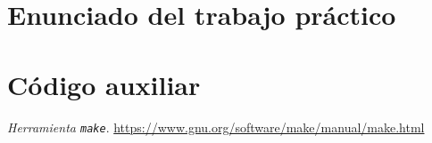 \documentclass[titlepage,a4paper]{article}
\begin{document}
\section{Enunciado del trabajo práctico}
% 

\newpage
\section{Código auxiliar}


\newpage
\begin{thebibliography}{9}


\cprotect\textit{Herramienta \verb|make|}. 
\href {https://www.gnu.org/software/make/manual/make.html}{
https://www.gnu.org/software/make/manual/make.html
}



\end{thebibliography}
\end{document}
